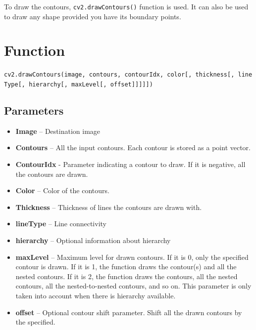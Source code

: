 \documentclass[]{article}
\providecommand{\tightlist}{%
  \setlength{\itemsep}{0pt}\setlength{\parskip}{0pt}}
\begin{document}
To draw the contours, \texttt{cv2.drawContours()} function is used. It
can also be used to draw any shape provided you have its boundary
points.

\section{Function}\label{function-1}

\texttt{cv2.drawContours(image,\ contours,\ contourIdx,\ color{[},\ thickness{[},\ lineType{[},\ hierarchy{[},\ maxLevel{[},\ offset{]}{]}{]}{]}{]})}

\subsection{Parameters}\label{parameters-1}

\begin{itemize}
\tightlist
\item
  \textbf{Image} -- Destination image\\
\item
  \textbf{Contours} -- All the input contours. Each contour is stored as
  a point vector.\\
\item
  \textbf{ContourIdx} - Parameter indicating a contour to draw. If it is
  negative, all the contours are drawn.\\
\item
  \textbf{Color} -- Color of the contours.\\
\item
  \textbf{Thickness} -- Thickness of lines the contours are drawn
  with.\\
\item
  \textbf{lineType} -- Line connectivity\\
\item
  \textbf{hierarchy} -- Optional information about hierarchy\\
\item
  \textbf{maxLevel} -- Maximum level for drawn contours. If it is 0,
  only the specified contour is drawn. If it is 1, the function draws
  the contour(s) and all the nested contours. If it is 2, the function
  draws the contours, all the nested contours, all the nested-to-nested
  contours, and so on. This parameter is only taken into account when
  there is hierarchy available.\\
\item
  \textbf{offset} -- Optional contour shift parameter. Shift all the
  drawn contours by the specified.
\end{itemize}
\end{document}

